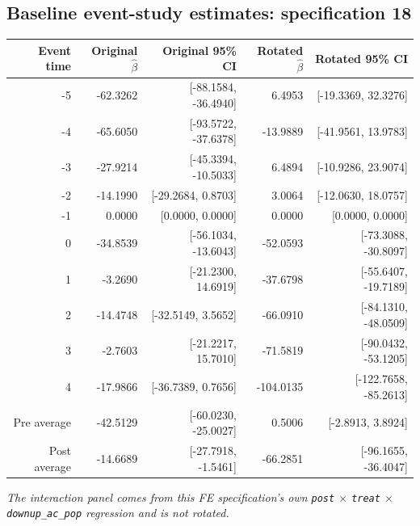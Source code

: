 \documentclass[10pt]{article}
\begin{document}
\subsection*{Baseline event-study estimates: specification 18}
\begin{center}
\scriptsize
\begin{tabular}{r rr rr}
\toprule
Event time & Original $\hat\beta$ & Original 95\% CI & Rotated $\hat\beta$ & Rotated 95\% CI \\
\midrule
-5 & -62.3262 & [-88.1584, -36.4940] & 6.4953 & [-19.3369, 32.3276] \\
-4 & -65.6050 & [-93.5722, -37.6378] & -13.9889 & [-41.9561, 13.9783] \\
-3 & -27.9214 & [-45.3394, -10.5033] & 6.4894 & [-10.9286, 23.9074] \\
-2 & -14.1990 & [-29.2684, 0.8703] & 3.0064 & [-12.0630, 18.0757] \\
-1 & 0.0000 & [0.0000, 0.0000] & 0.0000 & [0.0000, 0.0000] \\
0 & -34.8539 & [-56.1034, -13.6043] & -52.0593 & [-73.3088, -30.8097] \\
1 & -3.2690 & [-21.2300, 14.6919] & -37.6798 & [-55.6407, -19.7189] \\
2 & -14.4748 & [-32.5149, 3.5652] & -66.0910 & [-84.1310, -48.0509] \\
3 & -2.7603 & [-21.2217, 15.7010] & -71.5819 & [-90.0432, -53.1205] \\
4 & -17.9866 & [-36.7389, 0.7656] & -104.0135 & [-122.7658, -85.2613] \\
\midrule
Pre average & -42.5129 & [-60.0230, -25.0027] & 0.5006 & [-2.8913, 3.8924] \\
Post average & -14.6689 & [-27.7918, -1.5461] & -66.2851 & [-96.1655, -36.4047] \\
\bottomrule
\end{tabular}
\end{center}
\medskip
\textit{The interaction panel comes from this FE specification's own \texttt{post} $\times$ \texttt{treat} $\times$ \texttt{downup\_ac\_pop} regression and is not rotated.}
\clearpage
\end{document}

